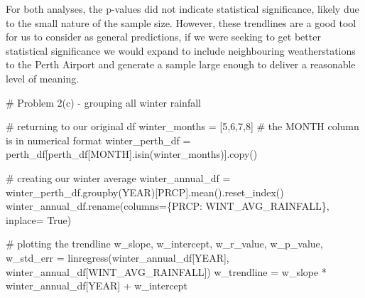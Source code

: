\documentclass[
  letterpaper,
  DIV=11,
  numbers=noendperiod]{scrartcl}
\newenvironment{Shaded}{\begin{snugshade}}{\end{snugshade}}
\newcommand{\CommentTok}[1]{\textcolor[rgb]{0.37,0.37,0.37}{#1}}
\newcommand{\DecValTok}[1]{\textcolor[rgb]{0.68,0.00,0.00}{#1}}
\newcommand{\NormalTok}[1]{\textcolor[rgb]{0.00,0.23,0.31}{#1}}
\newcommand{\OperatorTok}[1]{\textcolor[rgb]{0.37,0.37,0.37}{#1}}
\newcommand{\StringTok}[1]{\textcolor[rgb]{0.13,0.47,0.30}{#1}}
\newcommand{\VariableTok}[1]{\textcolor[rgb]{0.07,0.07,0.07}{#1}}
\begin{document}
For both analyses, the p-values did not indicate statistical
significance, likely due to the small nature of the sample size.
However, these trendlines are a good tool for us to consider as general
predictions, if we were seeking to get better statistical significance
we would expand to include neighbouring weatherstations to the Perth
Airport and generate a sample large enough to deliver a reasonable level
of meaning.

\begin{Shaded}
\begin{Highlighting}[]
\CommentTok{\# Problem 2(c) {-} grouping all winter rainfall}

\CommentTok{\# returning to our original df}
\NormalTok{winter\_months }\OperatorTok{=}\NormalTok{ [}\DecValTok{5}\NormalTok{,}\DecValTok{6}\NormalTok{,}\DecValTok{7}\NormalTok{,}\DecValTok{8}\NormalTok{] }\CommentTok{\# the MONTH column is in numerical format}
\NormalTok{winter\_perth\_df }\OperatorTok{=}\NormalTok{ perth\_df[perth\_df[}\StringTok{\textquotesingle{}MONTH\textquotesingle{}}\NormalTok{].isin(winter\_months)].copy()}

\CommentTok{\# creating our winter average}
\NormalTok{winter\_annual\_df }\OperatorTok{=}\NormalTok{ winter\_perth\_df.groupby(}\StringTok{\textquotesingle{}YEAR\textquotesingle{}}\NormalTok{)[}\StringTok{\textquotesingle{}PRCP\textquotesingle{}}\NormalTok{].mean().reset\_index()}
\NormalTok{winter\_annual\_df.rename(columns}\OperatorTok{=}\NormalTok{\{}\StringTok{\textquotesingle{}PRCP\textquotesingle{}}\NormalTok{: }\StringTok{\textquotesingle{}WINT\_AVG\_RAINFALL\textquotesingle{}}\NormalTok{\}, inplace}\OperatorTok{=} \VariableTok{True}\NormalTok{)}


\CommentTok{\# plotting the trendline}
\NormalTok{w\_slope, w\_intercept, w\_r\_value, w\_p\_value, w\_std\_err }\OperatorTok{=}\NormalTok{ linregress(winter\_annual\_df[}\StringTok{\textquotesingle{}YEAR\textquotesingle{}}\NormalTok{], winter\_annual\_df[}\StringTok{\textquotesingle{}WINT\_AVG\_RAINFALL\textquotesingle{}}\NormalTok{])}
\NormalTok{w\_trendline }\OperatorTok{=}\NormalTok{ w\_slope }\OperatorTok{*}\NormalTok{ winter\_annual\_df[}\StringTok{\textquotesingle{}YEAR\textquotesingle{}}\NormalTok{] }\OperatorTok{+}\NormalTok{ w\_intercept}


\end{Highlighting}
\end{Shaded}
\end{document}
